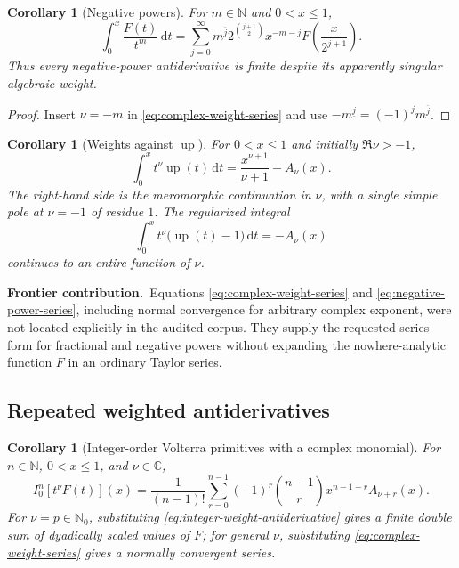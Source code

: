 \documentclass[11pt,oneside]{article}
\newtheorem{corollary}[theorem]{Corollary}
\theoremstyle{definition}
\theoremstyle{remark}
\newcommand{\C}{\mathbb C}
\newcommand{\N}{\mathbb N}
\newcommand{\dd}{\,\mathrm d}
\newcommand{\upf}{\operatorname{up}}
\newcommand{\falling}[2]{#1^{\underline{#2}}}
\newcommand{\rising}[2]{#1^{\overline{#2}}}
\newcommand{\newresult}{\par\medskip\noindent\textcolor{deepblue}{\textbf{Frontier contribution.}}\ }
\begin{document}
\begin{corollary}[Negative powers]\label{cor:negative-powers}
For $m\in\N$ and $0<x\le1$,
\begin{equation}\label{eq:negative-power-series}
 \int_0^x\frac{F(t)}{t^m}\dd t
 =\sum_{j=0}^{\infty}\rising{m}{j}
 2^{\binom{j+1}{2}}x^{-m-j}
 F\!\left(\frac{x}{2^{j+1}}\right).
\end{equation}
Thus every negative-power antiderivative is finite despite its apparently singular algebraic weight.
\end{corollary}

\begin{proof}
Insert $\nu=-m$ in \eqref{eq:complex-weight-series} and use
$\falling{-m}{j}=(-1)^j\rising{m}{j}$.
\end{proof}

\begin{corollary}[Weights against $\upf$]\label{cor:up-complex-weight}
For $0<x\le1$ and initially $\Re\nu>-1$,
\begin{equation}\label{eq:up-complex-weight}
 \int_0^x t^\nu\upf(t)\dd t
 =\frac{x^{\nu+1}}{\nu+1}-A_\nu(x).
\end{equation}
The right-hand side is the meromorphic continuation in $\nu$, with a single simple pole at $\nu=-1$ of residue $1$.  The regularized integral
\begin{equation}
 \int_0^x t^\nu\bigl(\upf(t)-1\bigr)\dd t=-A_\nu(x)
\end{equation}
continues to an entire function of $\nu$.
\end{corollary}

\newresult Equations \eqref{eq:complex-weight-series} and \eqref{eq:negative-power-series}, including normal convergence for arbitrary complex exponent, were not located explicitly in the audited corpus.  They supply the requested series form for fractional and negative powers without expanding the nowhere-analytic function $F$ in an ordinary Taylor series.

\subsection{Repeated weighted antiderivatives}

\begin{corollary}[Integer-order Volterra primitives with a complex monomial]\label{cor:weighted-nth-primitive}
For $n\in\N$, $0<x\le1$, and $\nu\in\C$,
\begin{equation}\label{eq:weighted-nth-primitive}
 I_0^n[t^\nu F(t)](x)
 =\frac1{(n-1)!}\sum_{r=0}^{n-1}(-1)^r
 \binom{n-1}{r}x^{n-1-r}A_{\nu+r}(x).
\end{equation}
For $\nu=p\in\N_0$, substituting \eqref{eq:integer-weight-antiderivative} gives a finite double sum of dyadically scaled values of $F$; for general $\nu$, substituting \eqref{eq:complex-weight-series} gives a normally convergent series.
\end{corollary}
\end{document}
